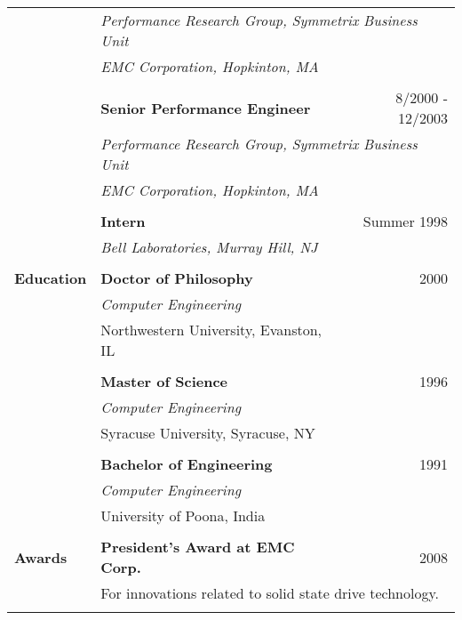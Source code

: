 \begin{longtable}{p{ 90pt}p{299pt}r}
                      & \multicolumn{2}{p{4.5in}}{\em Performance Research Group, Symmetrix Business Unit} \\
                      & {\em EMC Corporation, Hopkinton, MA} \\
\\
                      & {\bf Senior Performance Engineer} & {8/2000 - 12/2003}\\
                      & \multicolumn{2}{p{4.5in}}{\em Performance Research Group, Symmetrix Business Unit} \\
                      & {\em EMC Corporation, Hopkinton, MA} \\
\\
                      & {\bf Intern} & {Summer 1998}\\
                      & {\em Bell Laboratories, Murray Hill, NJ} \\
\\
{\bf Education}       & {\bf Doctor of Philosophy} & 2000\\
                      & {\em Computer Engineering} \\
                      & {Northwestern University, Evanston, IL} \\
\\
                      & {\bf Master of Science} & 1996\\
                      & {\em Computer Engineering} \\
	              & {Syracuse University, Syracuse, NY} \\
\\
                      & {\bf Bachelor of Engineering} & 1991\\
                      & {\em Computer Engineering} \\
	              & {University of Poona, India} \\
\\
{\bf Awards}         & {\bf President's Award at EMC Corp.} & 2008 \\
                     & \multicolumn{2}{p{3.35in}}{For innovations related to solid state drive technology.}\\
\\
\end{longtable}
